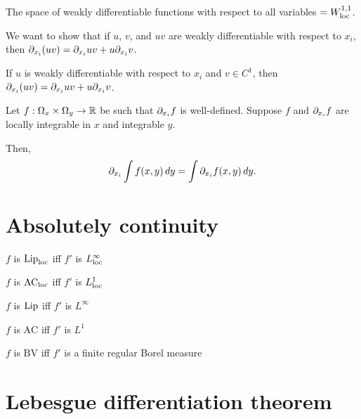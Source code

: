\documentclass{../note}
\begin{document}
The space of weakly differentiable functions with respect to all variables $=W_{\mathrm{loc}}^{1,1}$.

\begin{prb}
We want to show that if $u$, $v$, and $uv$ are weakly differentiable with respect to $x_i$, then $\pd_{x_i}(uv)=\pd_{x_i}uv+u\pd_{x_i}v$.
\begin{parts}
\item If $u$ is weakly differentiable with respect to $x_i$ and $v\in C^1$, then $\pd_{x_i}(uv)=\pd_{x_i}uv+u\pd_{x_i}v$.
\end{parts}
\end{prb}


\begin{prb}
Let $f:\Omega_x\times\Omega_y\to\mathbb{R}$ be such that $\pd_{x_i}f$ is well-defined. Suppose $f$ and $\pd_{x_i}f$ are locally integrable in $x$ and integrable $y$.

Then,
\[\pd_{x_i}\int f(x,y)\,dy=\int\pd_{x_i}f(x,y)\,dy.\]
\end{prb}





\chapter{Absolutely continuity}

\begin{parts}
\item $f$ is $\operatorname{Lip}_{\mathrm{loc}}$ iff $f'$ is $L_{\mathrm{loc}}^\infty$
\item $f$ is $\textrm{AC}_{\mathrm{loc}}$ iff $f'$ is $L_{\mathrm{loc}}^1$
\end{parts}
\begin{parts}
\item $f$ is $\operatorname{Lip}$ iff $f'$ is $L^\infty$
\item $f$ is $\textrm{AC}$ iff $f'$ is $L^1$
\item $f$ is $\textrm{BV}$ iff $f'$ is a finite regular Borel measure
\end{parts}



\chapter{Lebesgue differentiation theorem}
\end{document}
